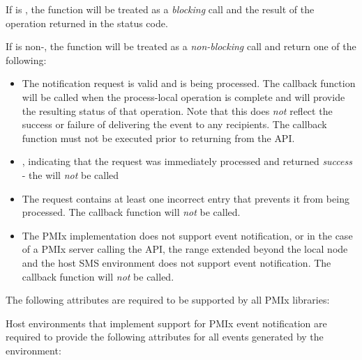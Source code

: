 If  is , the function will be treated as a \emph{blocking} call and the result of the operation returned in the status code.

If  is non-, the function will be treated as a \emph{non-blocking} call and return one of the following:

\begin{itemize}
\item {} The notification request is valid and is being processed. The callback function will be called when the process-local operation is complete and will provide the resulting status of that operation. Note that this does \textit{not} reflect the success or failure of delivering the event to any recipients. The callback function must not be executed prior to returning from the \ac{API}.
\item {}, indicating that the request was immediately processed and returned \textit{success} - the  will \textit{not} be called
\item {} The request contains at least one incorrect entry that prevents it from being processed. The callback function will \textit{not} be called.
\item {} The \ac{PMIx} implementation does not support event notification, or in the case of a \ac{PMIx} server calling the API, the range extended beyond the local node and the host \ac{SMS} environment does not support event notification. The callback function will \textit{not} be called.
\end{itemize}

\reqattrstart
The following attributes are required to be supported by all \ac{PMIx} libraries:


\divider

Host environments that implement support for \ac{PMIx} event notification are required to provide the following attributes for all events generated by the environment:


\reqattrend


